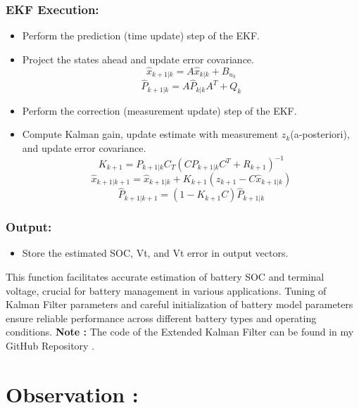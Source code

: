 \documentclass[conference]{IEEEtran}
\begin{document}
\subsubsection{EKF Execution:}
\begin{itemize}
  \item Perform the prediction (time update) step of the EKF.
  \item Project the states ahead and update error covariance.
  $${\hat{x}_{k+1|k} = A\hat{x}_{k|k} + B_{u_k}}$$
  $${\hat{P}_{k+1|k} = A\hat{P}_{k|k}A^T + Q_{k}}$$
  \item Perform the correction (measurement update) step of the EKF.
  \item Compute Kalman gain, update estimate with measurement $z_k$(a-posteriori), and update error covariance.
  $${K_{k+1} = P_{k+1|k}C_T(CP_{k+1|k}C^T+R_{k+1})^{-1}}$$
  $${\hat{x}_{k+1|k+1} = \hat{x}_{k+1|k} + K_{k+1}(z_{k+1} - C\hat{x}_{k+1|k})}$$
  $${\hat{P}_{k+1|k+1} = (1-K_{k+1}C)\hat{P}_{k+1|k} }$$
\end{itemize}


\subsubsection{Output:}
\begin{itemize}
  \item Store the estimated SOC, Vt, and Vt error in output vectors.
\end{itemize}

This function facilitates accurate estimation of battery SOC and terminal voltage, crucial for battery management in various applications. Tuning of Kalman Filter parameters and careful initialization of battery model parameters ensure reliable performance across different battery types and operating conditions.\newline
\textbf{Note :} The code of the Extended Kalman Filter can be found in my GitHub Repository \cite{github_repo}.

\section{Observation :}
\end{document}
